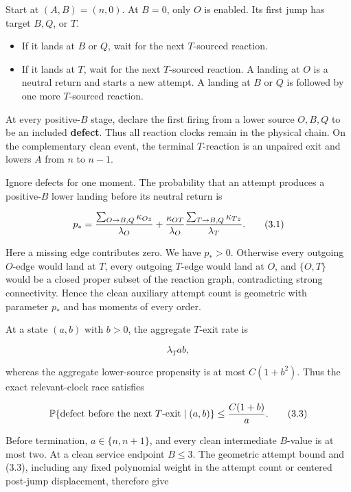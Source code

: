 Start at \((A,B)=(n,0)\). At \(B=0\), only \(O\) is enabled. Its first
jump has target \(B,Q\), or \(T\).

\begin{itemize}
\tightlist
\item
  If it lands at \(B\) or \(Q\), wait for the next \(T\)-sourced
  reaction.
\item
  If it lands at \(T\), wait for the next \(T\)-sourced reaction. A
  landing at \(O\) is a neutral return and starts a new attempt. A
  landing at \(B\) or \(Q\) is followed by one more \(T\)-sourced
  reaction.
\end{itemize}

At every positive-\(B\) stage, declare the first firing from a lower
source \(O,B,Q\) to be an included \textbf{defect}. Thus all reaction
clocks remain in the physical chain. On the complementary clean event,
the terminal \(T\)-reaction is an unpaired exit and lowers \(A\) from
\(n\) to \(n-1\).

Ignore defects for one moment. The probability that an attempt produces
a positive-\(B\) lower landing before its neutral return is

\[
 p_*={\sum_{O\to B,Q}\kappa_{Oz}\over\lambda_O}
 +{\kappa_{OT}\over\lambda_O}
   {\sum_{T\to B,Q}\kappa_{Tz}\over\lambda_T}.                \tag{3.1}
\]

Here a missing edge contributes zero. We have \(p_*>0\). Otherwise every
outgoing \(O\)-edge would land at \(T\), every outgoing \(T\)-edge would
land at \(O\), and \(\{O,T\}\) would be a closed proper subset of the
reaction graph, contradicting strong connectivity. Hence the clean
auxiliary attempt count is geometric with parameter \(p_*\) and has
moments of every order.

At a state \((a,b)\) with \(b>0\), the aggregate \(T\)-exit rate is

\[
                         \lambda_T ab,                           \tag{3.2}
\]

whereas the aggregate lower-source propensity is at most \(C(1+b^2)\).
Thus the exact relevant-clock race satisfies

\[
 \mathbb P\{\hbox{defect before the next }T\hbox{-exit}\mid(a,b)\}
 \le {C(1+b)\over a}.                                           \tag{3.3}
\]

Before termination, \(a\in\{n,n+1\}\), and every clean intermediate
\(B\)-value is at most two. At a clean service endpoint \(B\le3\). The
geometric attempt bound and (3.3), including any fixed polynomial weight
in the attempt count or centered post-jump displacement, therefore give

